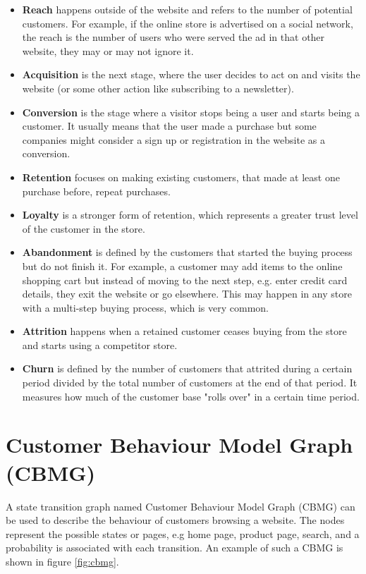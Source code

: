\begin{itemize}
    \item \textbf{Reach} happens outside of the website and refers to the 
    number of potential customers. For example, if the online store is 
    advertised on a social network, the reach is the number of users who were 
    served the ad in that other website, they may or may not ignore it.
    \item \textbf{Acquisition} is the next stage, where the user decides to act 
    on and visits the website (or some other action like subscribing to a 
    newsletter).
    \item \textbf{Conversion} is the stage where a visitor stops being a user 
    and starts being a customer. It usually means that the user made a purchase 
    but some companies might consider a sign up or registration in the website 
    as a conversion.
    \item \textbf{Retention} focuses on making existing customers, that made at 
    least  one purchase before, repeat purchases.
    \item \textbf{Loyalty} is a stronger form of retention, which represents a 
    greater trust level of the customer in the store.
    \item \textbf{Abandonment} is defined by the customers that started the 
    buying process but do not finish it. For example, a customer may add items 
    to the online shopping cart but instead of moving to the next step, e.g. 
    enter credit card details, they exit the website or go elsewhere. This may 
    happen in any store with a multi-step buying process, which is very common.
    \item \textbf{Attrition} happens when a retained customer ceases buying 
    from the store and starts using a competitor store.
    \item \textbf{Churn} is defined by the number of customers that attrited 
    during a certain period divided by the total number of customers at the end 
    of that period. It measures how much of the customer base "rolls over" in a 
    certain time period.
\end{itemize}

\section{Customer Behaviour Model Graph (CBMG)}

A state transition graph named Customer Behaviour Model Graph (CBMG) can be 
used to describe the behaviour of customers browsing a website. The nodes 
represent the possible states or pages, e.g home page, product page, search, 
and a probability is associated with each transition. An example of such a CBMG 
is shown in figure \ref{fig:cbmg}.

